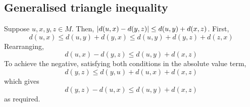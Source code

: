\subsection{Generalised triangle inequality}
Suppose \( u,x,y,z \in M \).
Then, \( \abs{d(u,x) - d(y,z)} \leq d(u,y) + d(x,z) \).
First,
\[
	d(u,x) \leq d(u,y) + d(y,x) \leq d(u,y) + d(y,z) + d(z,x)
\]
Rearranging,
\[
	d(u,x)-d(y,z) \leq d(u,y) + d(x,z)
\]
To achieve the negative, satisfying both conditions in the absolute value term,
\[
	d(y,z) \leq d(y,u) + d(u,x) + d(x,z)
\]
which gives
\[
	d(y,z) - d(u,x) \leq d(u,y) + d(x,z)
\]
as required.

